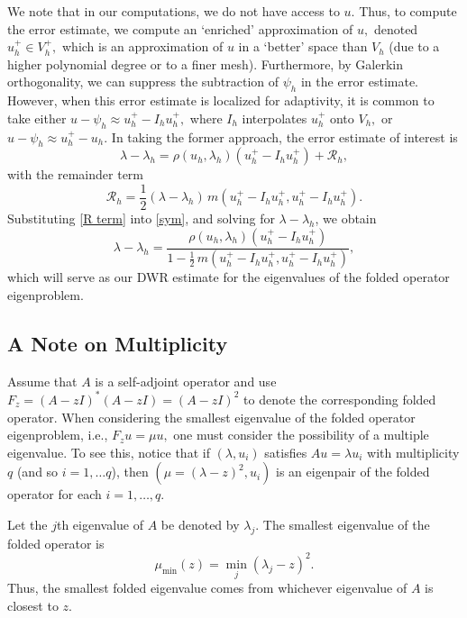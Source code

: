 \documentclass[12pt,a4paper]{article}
\theoremstyle{boldthm}
\theoremstyle{bolddefn}
\begin{document}
We note that in our computations, we do not have access to $u.$ Thus, to compute the error estimate, we compute an `enriched' approximation of $u,$ denoted $u_h^+ \in V_h^+,$ which is an approximation of $u$ in a `better' space than $V_h$ (due to a higher polynomial degree or to a finer mesh). Furthermore, by Galerkin orthogonality, we can suppress the subtraction of $\psi_h$ in the error estimate. However, when this error estimate is localized for adaptivity, it is common to take either $u - \psi_h \approx u_h^+ - I_h u_h^+,$ where $I_h$ interpolates $u_h^+$ onto $V_h,$ or $u - \psi_h \approx u_h^+ - u_h.$ In taking the former approach, the error estimate of interest is 
\begin{equation} \label{sym}
\lambda - \lambda_h
=
\rho(u_h,\lambda_h)(u_h^+-I_h u_h^+)
+
\mathcal{R}_h,
\end{equation} 
with the remainder term
\begin{equation} \label{R term}
\mathcal{R}_h
=
\frac{1}{2}(\lambda-\lambda_h)
\, m(u_h^+- I_h u_h^+,u_h^+- I_hu_h^+).
\end{equation}
Substituting \eqref{R term} into \eqref{sym}, and solving for $\lambda - \lambda_h$, we obtain
\begin{equation} \label{eta}
    \lambda - \lambda_h = \frac{\rho(u_h,\lambda_h)(u_h^+-I_h u_h^+) }{ 1 - \frac{1}{2} \,m(u_h^+- I_h u_h^+,u_h^+- I_hu_h^+) },
\end{equation}
which will serve as our DWR estimate for the eigenvalues of the folded operator eigenproblem.


\subsection{A Note on Multiplicity}

Assume that $A$ is a self-adjoint operator and use $F_z = (A-zI)^*(A-zI) = (A-zI)^2$ to denote the corresponding folded operator. When considering the smallest eigenvalue of the folded operator eigenproblem, i.e., $F_z u = \mu u,$ one must consider the possibility of a multiple eigenvalue. To see this, notice that if $(\lambda, u_i)$ satisfies $A u = \lambda u_i$ with multiplicity $q$ (and so $i=1, \dots q$), then $(\mu = (\lambda-z)^2, u_i)$ is an eigenpair of the folded operator for each $i=1, \dots, q.$ 

Let the $j$th eigenvalue of $A$ be denoted by $\lambda_j.$ The smallest eigenvalue of the folded operator is
\begin{equation}
    \mu_{\min}(z) = \min_j (\lambda_j-z)^2 .
\end{equation}
Thus, the smallest folded eigenvalue comes from whichever eigenvalue of $A$ is
closest to $z$.
\end{document}
